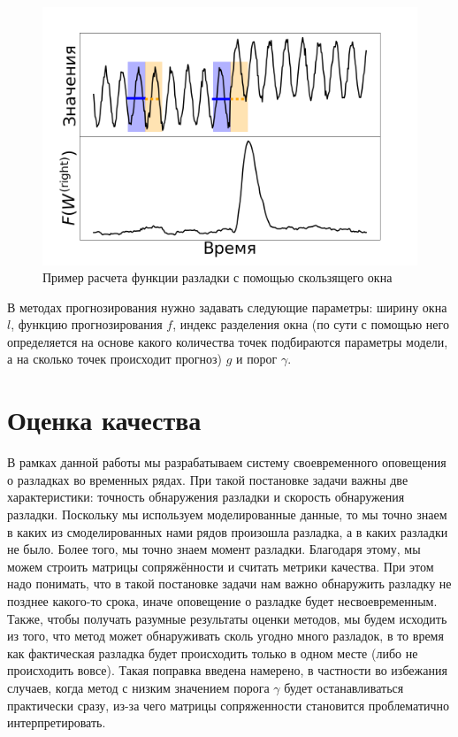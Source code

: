 \documentclass[%
12pt,
master,  %
natbib,      %
subf,        %
substylefile = spbu.rtx,
href,        %
colorlinks,  %
]{disser}
\begin{document}
\begin{figure}[!hhh]
	\begin{center}
		\includegraphics[width=12cm]{approaches_first_6_ru}
	\end{center}
	\vspace{-5mm}\caption{Пример расчета функции разладки с помощью скользящего окна}
	\label{fig:predicition_example_2}
\end{figure}

В методах прогнозирования нужно задавать следующие параметры: ширину окна $l$, функцию прогнозирования $f$, индекс разделения окна (по сути с помощью него определяется на основе какого количества точек подбираются параметры модели, а на сколько точек происходит прогноз) $g$ и порог $\gamma$.



\section{Оценка качества}

В рамках данной работы мы разрабатываем систему своевременного оповещения о разладках во временных рядах. При такой постановке задачи важны две характеристики: точность обнаружения разладки и скорость обнаружения разладки. Поскольку мы используем моделированные данные, то мы точно знаем в каких из смоделированных нами рядов произошла разладка, а в каких разладки не было. Более того, мы точно знаем момент разладки. Благодаря этому, мы можем строить матрицы сопряжённости и считать метрики качества. При этом надо понимать, что в такой постановке задачи нам важно обнаружить разладку не позднее какого-то срока, иначе оповещение о разладке будет несвоевременным. Также, чтобы получать разумные результаты оценки методов, мы будем исходить из того, что метод может обнаруживать сколь угодно много разладок, в то время как фактическая разладка будет происходить только в одном месте (либо не происходить вовсе). Такая поправка введена намерено, в частности во избежания случаев, когда метод с низким значением порога $\gamma$ будет останавливаться практически сразу, из-за чего матрицы сопряженности становится проблематично интерпретировать.
\end{document}
